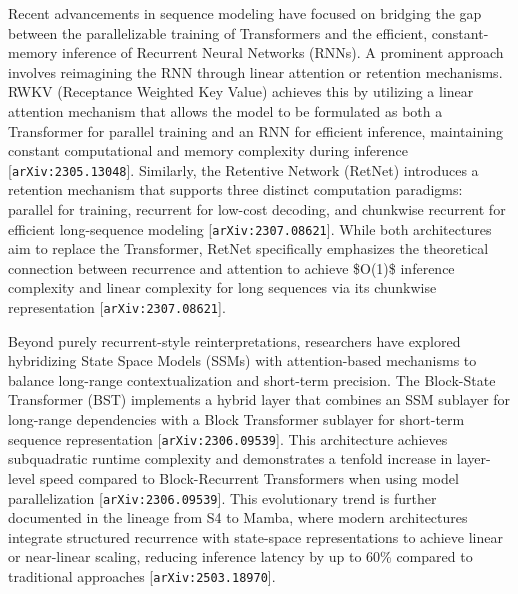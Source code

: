 \documentclass[11pt]{article}
\begin{document}
Recent advancements in sequence modeling have focused on bridging the gap between the parallelizable training of Transformers and the efficient, constant-memory inference of Recurrent Neural Networks (RNNs). A prominent approach involves reimagining the RNN through linear attention or retention mechanisms. RWKV (Receptance Weighted Key Value) achieves this by utilizing a linear attention mechanism that allows the model to be formulated as both a Transformer for parallel training and an RNN for efficient inference, maintaining constant computational and memory complexity during inference [\texttt{arXiv:2305.13048}]. Similarly, the Retentive Network (RetNet) introduces a retention mechanism that supports three distinct computation paradigms: parallel for training, recurrent for low-cost decoding, and chunkwise recurrent for efficient long-sequence modeling [\texttt{arXiv:2307.08621}]. While both architectures aim to replace the Transformer, RetNet specifically emphasizes the theoretical connection between recurrence and attention to achieve \$O(1)\$ inference complexity and linear complexity for long sequences via its chunkwise representation [\texttt{arXiv:2307.08621}].

Beyond purely recurrent-style reinterpretations, researchers have explored hybridizing State Space Models (SSMs) with attention-based mechanisms to balance long-range contextualization and short-term precision. The Block-State Transformer (BST) implements a hybrid layer that combines an SSM sublayer for long-range dependencies with a Block Transformer sublayer for short-term sequence representation [\texttt{arXiv:2306.09539}]. This architecture achieves subquadratic runtime complexity and demonstrates a tenfold increase in layer-level speed compared to Block-Recurrent Transformers when using model parallelization [\texttt{arXiv:2306.09539}]. This evolutionary trend is further documented in the lineage from S4 to Mamba, where modern architectures integrate structured recurrence with state-space representations to achieve linear or near-linear scaling, reducing inference latency by up to 60\% compared to traditional approaches [\texttt{arXiv:2503.18970}].
\end{document}
